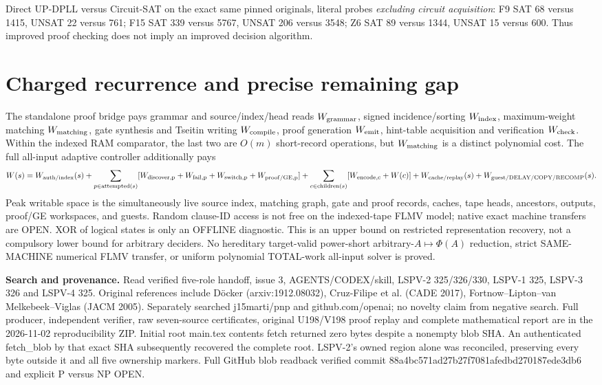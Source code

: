 \documentclass[11pt]{article}
\begin{document}
Direct UP-DPLL versus Circuit-SAT on the exact same pinned originals, literal probes \emph{excluding circuit acquisition}: F9 SAT 68 versus 1415, UNSAT 22 versus 761; F15 SAT 339 versus 5767, UNSAT 206 versus 3548; Z6 SAT 89 versus 1344, UNSAT 15 versus 600. Thus improved proof checking does not imply an improved decision algorithm.

\section{Charged recurrence and precise remaining gap}
The standalone proof bridge pays grammar and source/index/head reads $W_{\rm grammar}$, signed incidence/sorting $W_{\rm index}$, maximum-weight matching $W_{\rm matching}$, gate synthesis and Tseitin writing $W_{\rm compile}$, proof generation $W_{\rm emit}$, hint-table acquisition and verification $W_{\rm check}$. Within the indexed RAM comparator, the last two are $O(m)$ short-record operations, but $W_{\rm matching}$ is a distinct polynomial cost. The full all-input adaptive controller additionally pays
\[
W(s)=W_{\rm auth/index}(s)+\sum_{p\in{\rm attempted}(s)}
 [W_{\rm discover,p}+W_{\rm fail,p}+W_{\rm switch,p}+W_{\rm proof/GE,p}]
 +\sum_{c\in{\rm children}(s)}[W_{\rm encode,c}+W(c)]
 +W_{\rm cache/replay}(s)+W_{\rm guest/DELAY/COPY/RECOMP}(s).
\]
Peak writable space is the simultaneously live source index, matching graph, gate and proof records, caches, tape heads, ancestors, outputs, proof/GE workspaces, and guests. Random clause-ID access is not free on the indexed-tape FLMV model; native exact machine transfers are OPEN. XOR of logical states is only an OFFLINE diagnostic. This is an upper bound on restricted representation recovery, not a compulsory lower bound for arbitrary deciders. No hereditary target-valid power-short arbitrary-$A\mapsto\Phi(A)$ reduction, strict SAME-MACHINE numerical FLMV transfer, or uniform polynomial TOTAL-work all-input solver is proved.

\noindent\textbf{Search and provenance.} Read verified five-role handoff, issue 3, AGENTS/CODEX/skill, LSPV-2 325/326/330, LSPV-1 325, LSPV-3 326 and LSPV-4 325. Original references include D\"ocker (arxiv:1912.08032), Cruz-Filipe et al. (CADE 2017), Fortnow--Lipton--van Melkebeek--Viglas (JACM 2005). Separately searched j15marti/pnp and github.com/openai; no novelty claim from negative search. Full producer, independent verifier, raw seven-source certificates, original U198/V198 proof replay and complete mathematical report are in the 2026-11-02 reproducibility ZIP. Initial root main.tex contents fetch returned zero bytes despite a nonempty blob SHA. An authenticated fetch\_blob by that exact SHA subsequently recovered the complete root. LSPV-2's owned region alone was reconciled, preserving every byte outside it and all five ownership markers. Full GitHub blob readback verified commit 88a4bc571ad27b27f7081afedbd270187ede3db6 and explicit P versus NP OPEN.
\end{document}
